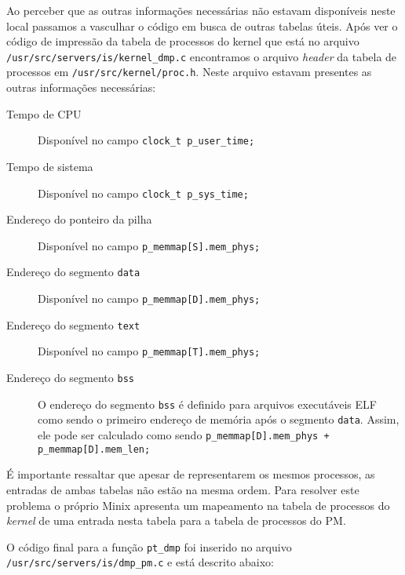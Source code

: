 \documentclass[brazil, a4paper]{scrartcl}
\begin{document}
Ao perceber que as outras informações necessárias não estavam disponíveis neste
local passamos a vasculhar o código em busca de outras tabelas úteis. Após ver o
código de impressão da tabela de processos do kernel que está no arquivo
\texttt{/usr/src/servers/is/kernel\_dmp.c} encontramos o arquivo \emph{header}
da tabela de processos em \texttt{/usr/src/kernel/proc.h}. Neste arquivo estavam
presentes as outras informações necessárias:

\begin{description}
	\item[Tempo de CPU] Disponível no campo \texttt{clock\_t p\_user\_time;}
	\item[Tempo de sistema] Disponível no campo \texttt{clock\_t p\_sys\_time;}
	\item[Endereço do ponteiro da pilha] Disponível no campo \texttt{p\_memmap[S].mem\_phys;}
	\item[Endereço do segmento \texttt{data}] Disponível no campo \texttt{p\_memmap[D].mem\_phys;}
	\item[Endereço do segmento \texttt{text}] Disponível no campo \texttt{p\_memmap[T].mem\_phys;}
	\item[Endereço do segmento \texttt{bss}] O endereço do segmento \texttt{bss} 
		é definido para arquivos executáveis ELF como sendo o primeiro endereço
		de memória após o segmento \texttt{data}. Assim, ele pode ser calculado
		como sendo \texttt{p\_memmap[D].mem\_phys + p\_memmap[D].mem\_len;}
\end{description}

É importante ressaltar que apesar de representarem os mesmos processos, as
entradas de ambas tabelas não estão na mesma ordem. Para resolver este problema
o próprio Minix apresenta um mapeamento na tabela de processos do \emph{kernel}
de uma entrada nesta tabela para a tabela de processos do PM.



O código final para a função \texttt{pt\_dmp} foi inserido no arquivo
\texttt{/usr/src/servers/is/dmp\_pm.c} e está descrito abaixo:
\end{document}
